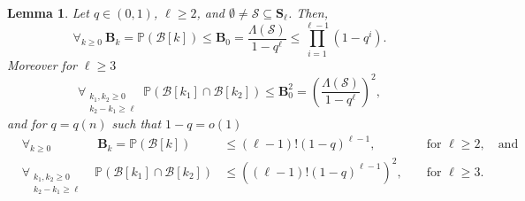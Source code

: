 \documentclass[letterpaper,11pt]{article}
\newtheorem{lemma}[theorem]{Lemma}
\theoremstyle{definition}
\theoremstyle{remark}
\renewcommand{\le}{\leqslant}
\renewcommand{\ge}{\geqslant}
\newcommand{\bS}{\mathbf{S}}
\newcommand{\productO}{\Lambda(\cS)}
\newcommand{\Pra}[1]{\mathbb{P}\left(#1\right)}
\newcommand{\bB}{\mathbf{B}}
\newcommand{\cB}{\mathcal{B}}
\newcommand{\cS}{\mathcal{S}}
\begin{document}
\begin{lemma}\label{Lem:QkLEQ0} Let $q \in (0,1)$, $\ell\ge 2$, and $\emptyset\neq\cS\subseteq \bS_\ell$. Then, 
	\[\forall_{k\ge 0}\ \bB_{k}=\Pra{\cB[k]}\le \bB_{0} = \frac{\productO}{1-q^{\ell}}\le \prod_{i=1}^{\ell-1}(1-q^i).\]
	Moreover for $\ell\ge 3$
	\[\forall_{\substack{k_1,k_2\ge 0\\ k_2-k_1\ge \ell}}\ \Pra{\cB[k_1]\cap \cB[k_2]}\le \bB_{0}^2 =  \left(\frac{\productO}{1-q^{\ell}}\right)^2,\]
	and for $q=q(n)$ such that $1-q=o(1)$
	\begin{align*}
		&\forall_{k\ge 0}&\ \bB_{k}=\Pra{\cB[k]}&\le (\ell-1)!(1-q)^{\ell-1}, &&\text{ for }\ell\ge 2,\quad \text{and}\\
		&\forall_{\substack{k_1,k_2\ge 0\\ k_2-k_1\ge \ell}}&\Pra{\cB[k_1]\cap \cB[k_2]}&\le\left((\ell-1)! (1-q)^{\ell-1}\right)^2, &&\text{ for }\ell\ge 3.
	\end{align*}
\end{lemma}
\end{document}
